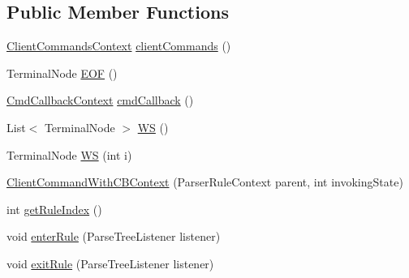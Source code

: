 \subsection*{Public Member Functions}
\begin{DoxyCompactItemize}
\item 
\hyperlink{classgov_1_1nasa_1_1jpf_1_1inspector_1_1client_1_1parser_1_1_console_grammar_parser_1_1_client_commands_context}{Client\+Commands\+Context} \hyperlink{classgov_1_1nasa_1_1jpf_1_1inspector_1_1client_1_1parser_1_1_console_grammar_parser_1_1_client_command_with_c_b_context_a38fe08e38b3f748df4519dd6d69350b9}{client\+Commands} ()
\item 
Terminal\+Node \hyperlink{classgov_1_1nasa_1_1jpf_1_1inspector_1_1client_1_1parser_1_1_console_grammar_parser_1_1_client_command_with_c_b_context_af5d279dae60cec02e8f0abbb7575c6ad}{E\+OF} ()
\item 
\hyperlink{classgov_1_1nasa_1_1jpf_1_1inspector_1_1client_1_1parser_1_1_console_grammar_parser_1_1_cmd_callback_context}{Cmd\+Callback\+Context} \hyperlink{classgov_1_1nasa_1_1jpf_1_1inspector_1_1client_1_1parser_1_1_console_grammar_parser_1_1_client_command_with_c_b_context_af5f63e991a5bba0f3d658697ad0f6049}{cmd\+Callback} ()
\item 
List$<$ Terminal\+Node $>$ \hyperlink{classgov_1_1nasa_1_1jpf_1_1inspector_1_1client_1_1parser_1_1_console_grammar_parser_1_1_client_command_with_c_b_context_aabac3ccdb73e11116c09fb0f96bce792}{WS} ()
\item 
Terminal\+Node \hyperlink{classgov_1_1nasa_1_1jpf_1_1inspector_1_1client_1_1parser_1_1_console_grammar_parser_1_1_client_command_with_c_b_context_adb3ce213754497c05a3027718e0b1b45}{WS} (int i)
\item 
\hyperlink{classgov_1_1nasa_1_1jpf_1_1inspector_1_1client_1_1parser_1_1_console_grammar_parser_1_1_client_command_with_c_b_context_a6b7a1c482eb3c6b7d57823f7e02278e8}{Client\+Command\+With\+C\+B\+Context} (Parser\+Rule\+Context parent, int invoking\+State)
\item 
int \hyperlink{classgov_1_1nasa_1_1jpf_1_1inspector_1_1client_1_1parser_1_1_console_grammar_parser_1_1_client_command_with_c_b_context_aa2c20f63afc92d5324444aa216d00adb}{get\+Rule\+Index} ()
\item 
void \hyperlink{classgov_1_1nasa_1_1jpf_1_1inspector_1_1client_1_1parser_1_1_console_grammar_parser_1_1_client_command_with_c_b_context_ae4bd617df91ec9966615fed7339f6308}{enter\+Rule} (Parse\+Tree\+Listener listener)
\item 
void \hyperlink{classgov_1_1nasa_1_1jpf_1_1inspector_1_1client_1_1parser_1_1_console_grammar_parser_1_1_client_command_with_c_b_context_a6dd55717021063e9eac973d9da68d915}{exit\+Rule} (Parse\+Tree\+Listener listener)
\end{DoxyCompactItemize}
